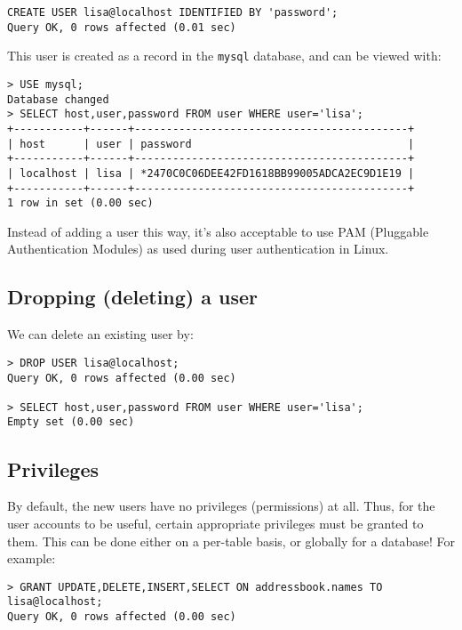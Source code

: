 \vspace{-15pt}
\begin{verbatim}
CREATE USER lisa@localhost IDENTIFIED BY 'password';
Query OK, 0 rows affected (0.01 sec)
\end{verbatim}
\vspace{-10pt}	

\noindent
This user is created as a record in the \verb|mysql| database, and can be viewed with:

\vspace{-15pt}
\begin{verbatim}
> USE mysql;
Database changed
> SELECT host,user,password FROM user WHERE user='lisa';
+-----------+------+-------------------------------------------+
| host      | user | password                                  |
+-----------+------+-------------------------------------------+
| localhost | lisa | *2470C0C06DEE42FD1618BB99005ADCA2EC9D1E19 |
+-----------+------+-------------------------------------------+
1 row in set (0.00 sec)
\end{verbatim}
\vspace{-10pt}	

\noindent
Instead of adding a user this way, it's also acceptable to use PAM (Pluggable Authentication Modules) as used during user authentication in Linux.

\subsection{Dropping (deleting) a user}
We can delete an existing user by:

\vspace{-15pt}
\begin{verbatim}
> DROP USER lisa@localhost;
Query OK, 0 rows affected (0.00 sec)

> SELECT host,user,password FROM user WHERE user='lisa';
Empty set (0.00 sec)
\end{verbatim}
\vspace{-10pt}	

\subsection{Privileges}
By default, the new users have no privileges (permissions) at all. Thus, for the user accounts to be useful, certain appropriate privileges must be granted to them. This can be done either on a per-table basis, or globally for a database! For example:

\vspace{-15pt}
\begin{verbatim}
> GRANT UPDATE,DELETE,INSERT,SELECT ON addressbook.names TO lisa@localhost;
Query OK, 0 rows affected (0.00 sec)
\end{verbatim}
\vspace{-10pt}	

